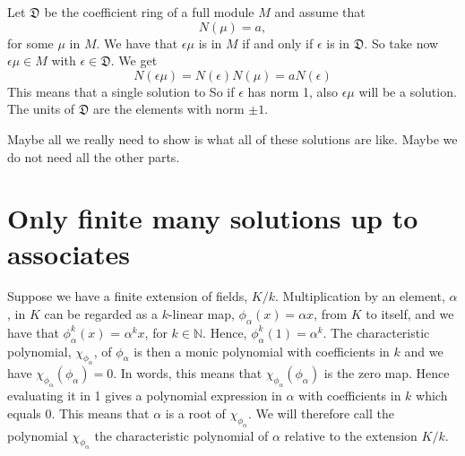 \documentclass{article}
\newcommand{\mfrak}[1]{\mathfrak{#1}}
\newcommand{\mbb}[1]{\mathbb{#1}}
\begin{document}
Let $\mfrak{D}$ be the coefficient ring of a full module $M$ and assume that 
$$N(\mu) = a,$$
for some $\mu$ in $M$. We have that $\epsilon \mu$ is in $M$ if and only if  $\epsilon$ is in $\mfrak{D}$. So take now $\epsilon \mu \in M$ with $\epsilon \in \mfrak{D}$. We get
$$N(\epsilon \mu) = N(\epsilon)N(\mu) = a N(\epsilon)$$
This means that a single solution to 
So if $\epsilon$ has norm 1, also $\epsilon \mu$ will be a solution. The units of $\mfrak{D}$ are the elements with norm $\pm 1$. 

Maybe all we really need to show is what all of these solutions are like. Maybe we do not need all the other parts. 




\section{Only finite many solutions up to associates}


Suppose we have a finite extension of fields, $K / k$. Multiplication by an element, $\alpha$, in $K$ can be regarded as a $k$-linear map, $\phi_\alpha(x) = \alpha x$, from $K$ to itself, and we have that $\phi_\alpha^k(x)$ = $\alpha^k x$, for $k \in \mbb N$. Hence, $\phi_\alpha^k(1) = \alpha^k$. The characteristic polynomial, $\chi_{\phi_\alpha}$, of $\phi_\alpha$ is then a monic polynomial with coefficients in $k$ and we have $\chi_{\phi_\alpha}(\phi_\alpha) = 0$. In words, this means that $\chi_{\phi_\alpha}(\phi_\alpha)$ is the zero map. Hence evaluating it in 1 gives a polynomial expression in $\alpha$ with coefficients in $k$ which equals 0. This means that $\alpha$ is a root of $\chi_{\phi_\alpha}$. We will therefore call the polynomial $\chi_{\phi_\alpha}$ the characteristic polynomial of $\alpha$ relative to the extension $K / k$.
\end{document}
